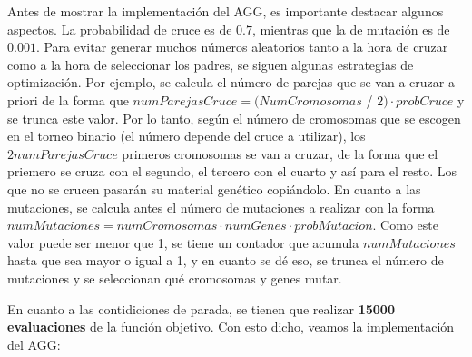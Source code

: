 \documentclass[11pt,a4paper]{article}
\begin{document}
Antes de mostrar la implementación del AGG, es importante destacar algunos aspectos. La probabilidad de cruce es de $0.7$,
mientras que la de mutación es de $0.001$. Para evitar generar muchos números aleatorios tanto a la hora de cruzar como a la
hora de seleccionar los padres, se siguen algunas estrategias de optimización. Por ejemplo, se calcula el número de parejas
que se van a cruzar a priori de la forma que $numParejasCruce = (NumCromosomas$ / $2) \cdot probCruce$ y se trunca este valor.
Por lo tanto, según el número de cromosomas que se escogen en el torneo binario (el número depende del cruce a utilizar), los
$2numParejasCruce$ primeros cromosomas se van a cruzar, de la forma que el priemero se cruza con el segundo, el tercero con el
cuarto y así para el resto. Los que no se crucen pasarán su material genético copiándolo. En cuanto a las mutaciones, se calcula
antes el número de mutaciones a realizar con la forma $numMutaciones = numCromosomas \cdot numGenes \cdot probMutacion$. Como
este valor puede ser menor que 1, se tiene un contador que acumula $numMutaciones$ hasta que sea mayor o igual a 1, y en cuanto
se dé eso, se trunca el número de mutaciones y se seleccionan qué cromosomas y genes mutar.

En cuanto a las contidiciones de parada, se tienen que realizar \textbf{15000 evaluaciones} de la función objetivo.
Con esto dicho, veamos la implementación del AGG:
\end{document}
